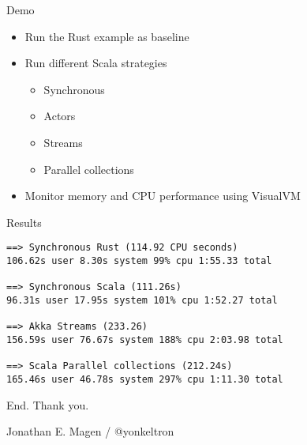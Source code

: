 \documentclass[aspectratio=169]{beamer}
\newcommand{\megatext}[1]{
  \begin{center}
    \Huge
    #1
  \end{center}
}
\begin{document}
\begin{frame}
  \megatext{Demo}

  \begin{itemize}
  \item Run the Rust example as baseline
  \item Run different Scala strategies
    \begin{itemize}
    \item Synchronous
    \item Actors
    \item Streams
    \item Parallel collections
    \end{itemize}
  \item Monitor memory and CPU performance using VisualVM
  \end{itemize}
\end{frame}

\begin{frame}[fragile]{Results}
  \begin{verbatim}
==> Synchronous Rust (114.92 CPU seconds)
106.62s user 8.30s system 99% cpu 1:55.33 total

==> Synchronous Scala (111.26s)
96.31s user 17.95s system 101% cpu 1:52.27 total

==> Akka Streams (233.26)
156.59s user 76.67s system 188% cpu 2:03.98 total

==> Scala Parallel collections (212.24s)
165.46s user 46.78s system 297% cpu 1:11.30 total
  \end{verbatim}
\end{frame}


\begin{frame}
  \megatext{End. Thank you.}
  \Large
  \centering
  Jonathan E. Magen /  @yonkeltron
\end{frame}
\end{document}
